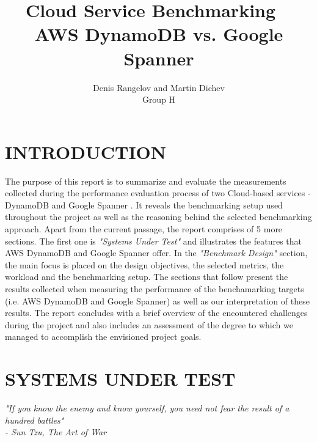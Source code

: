 \documentclass[letterpaper, 10 pt, conference]{ieeeconf}  %
\title{\huge \textbf{Cloud Service Benchmarking} 
\hfill \ \\
\LARGE{AWS DynamoDB vs. Google Spanner}
}
\author{Denis Rangelov and Martin Dichev
\\
Group H}
\begin{document}
\maketitle
\thispagestyle{empty}
\pagestyle{empty}

\section{INTRODUCTION}
The purpose of this report is to summarize and evaluate the measurements collected during the performance evaluation process of two Cloud-based services - DynamoDB \cite{DynamoWebPage} and Google Spanner \cite{SpannerWebPage}. It reveals the benchmarking setup used throughout the project as well as the reasoning behind the selected benchmarking approach. Apart from the current passage, the report comprises of 5 more sections. The first one is \textit{"Systems Under Test"} and illustrates the features that AWS DynamoDB and Google Spanner offer. In the \textit{"Benchmark Design"} section, the main focus is placed on the design objectives, the selected metrics, the workload and the benchmarking setup. The sections that follow present the results collected when measuring the performance of the benchamarking targets (i.e. AWS DynamoDB and Google Spanner) as well as our interpretation of these results. The report concludes with a brief overview of the encountered challenges during the project and also includes an assessment of the degree to which we managed to accomplish the envisioned project goals.





\section{SYSTEMS UNDER TEST}
\begin{center}
    \textit{"If you know the enemy and know yourself, you need not fear the result of a hundred battles" \\ 
    - Sun Tzu, The Art of War   }
\end{center}
\end{document}
